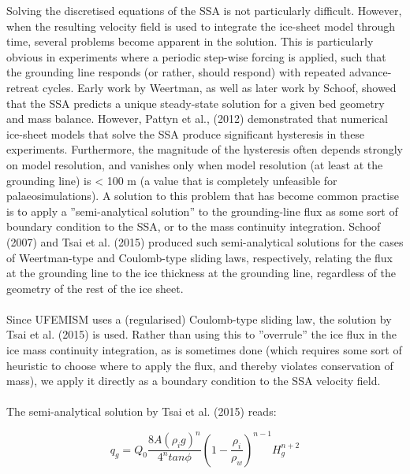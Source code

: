 \documentclass{article}
\begin{document}
Solving the discretised equations of the SSA is not particularly difficult. However, when the resulting velocity field is used to integrate the ice-sheet model through time, several problems become apparent in the solution. This is particularly obvious in experiments where a periodic step-wise forcing is applied, such that the grounding line responds (or rather, should respond) with repeated advance-retreat cycles. Early work by Weertman, as well as later work by Schoof, showed that the SSA predicts a unique steady-state solution for a given bed geometry and mass balance. However, Pattyn et al., (2012) demonstrated that numerical ice-sheet models that solve the SSA produce significant hysteresis in these experiments. Furthermore, the magnitude of the hysteresis often depends strongly on model resolution, and vanishes only when model resolution (at least at the grounding line) is < 100 m (a value that is completely unfeasible for palaeosimulations). A solution to this problem that has become common practise is to apply a ''semi-analytical solution'' to the grounding-line flux as some sort of boundary condition to the SSA, or to the mass continuity integration. Schoof (2007) and Tsai et al. (2015) produced such semi-analytical solutions for the cases of Weertman-type and Coulomb-type sliding laws, respectively, relating the flux at the grounding line to the ice thickness at the grounding line, regardless of the geometry of the rest of the ice sheet.\\
\\
Since UFEMISM uses a (regularised) Coulomb-type sliding law, the solution by Tsai et al. (2015) is used. Rather than using this to ''overrule'' the ice flux in the ice mass continuity integration, as is sometimes done (which requires some sort of heuristic to choose where to apply the flux, and thereby violates conservation of mass), we apply it directly as a boundary condition to the SSA velocity field.\\
\\
The semi-analytical solution by Tsai et al. (2015) reads:

\begin{equation}
q_g = Q_0 \frac{8A {\left( \rho_i g \right)}^n}{4^n tan \phi} \left( 1 - \frac{\rho_i}{\rho_w}\right)^{n-1} H_g^{n+2}
\end{equation}
\end{document}
